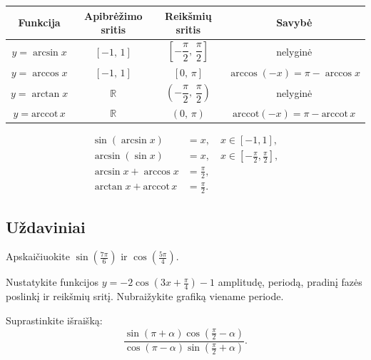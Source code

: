 \begin{center}
\begin{tabular}{c|c|c|c}
\textbf{Funkcija} & \textbf{Apibrėžimo sritis} & \textbf{Reikšmių sritis} & \textbf{Savybė} \\
\hline
\(y = \arcsin x\) & \([-1,\,1]\) & \(\left[-\dfrac{\pi}{2},\,\dfrac{\pi}{2}\right]\) & nelyginė \\[6pt]
\(y = \arccos x\) & \([-1,\,1]\) & \([0,\,\pi]\) & \(\arccos(-x)=\pi-\arccos x\) \\[6pt]
\(y = \arctan x\) & \(\mathbb{R}\) & \(\left(-\dfrac{\pi}{2},\,\dfrac{\pi}{2}\right)\) & nelyginė \\[6pt]
\(y = \text{arccot}\, x\) & \(\mathbb{R}\) & \((0,\,\pi)\) & \(\text{arccot}(-x)=\pi-\text{arccot}\,x\) \\[6pt]
\end{tabular}
\end{center}

\begin{tcolorbox}[title=Svarbios tapatybės su atvirkštinėmis funkcijomis]
\begin{align*}
\sin(\arcsin x) &= x, \quad x \in [-1,1],\\
\arcsin(\sin x) &= x, \quad x \in \left[-\tfrac{\pi}{2}, \tfrac{\pi}{2}\right],\\
\arcsin x + \arccos x &= \frac{\pi}{2},\\
\arctan x + \text{arccot}\, x &= \frac{\pi}{2}.
\end{align*}
\end{tcolorbox}

\subsection{Uždaviniai}

\begin{exercise}
Apskaičiuokite \(\sin\!\left(\frac{7\pi}{6}\right)\) ir \(\cos\!\left(\frac{5\pi}{4}\right)\).
\end{exercise}

\begin{exercise}
Nustatykite funkcijos \(y = -2\cos\!\left(3x + \frac{\pi}{4}\right) - 1\) amplitudę, periodą, pradinį fazės poslinkį ir reikšmių sritį. Nubraižykite grafiką viename periode.
\end{exercise}

\begin{exercise}
Suprastinkite išraišką:
\[
\frac{\sin\!\left(\pi + \alpha\right)\cos\!\left(\frac{\pi}{2} - \alpha\right)}{\cos\!\left(\pi - \alpha\right)\sin\!\left(\frac{\pi}{2} + \alpha\right)}.
\]
\end{exercise}

